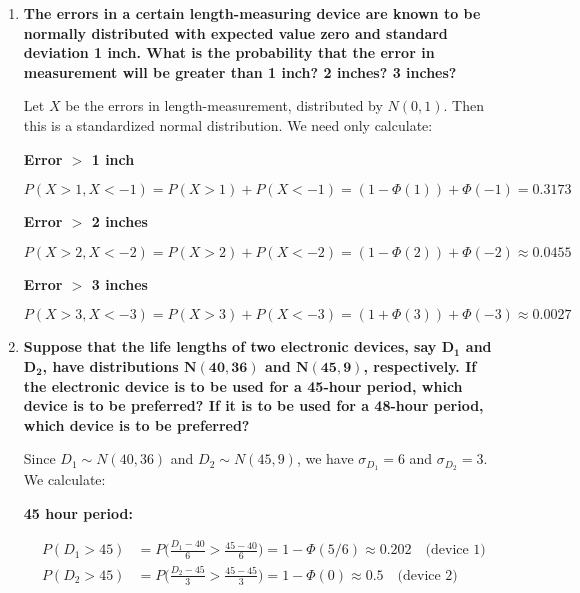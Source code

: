 \documentclass[10pt, oneside]{article}
\begin{document}
\begin{enumerate}[label=9.\arabic*]
We calculate $P(D > 0.825, D < 0.775) = P(\frac{0.825 - 0.8}{0.02} < \frac{D - 0.8}{0.02}) + P(\frac{D - 0.8}{0.02} < \frac{0.775 - 0.8}{0.02}) = (1 - \Phi(1.25)) + \Phi(-1.25) \approx \boxed{0.211}$.

\item  \begin{tcolorbox}[
  colback=Cerulean!5!white,
  colframe=Cerulean!75!black]
\textbf{The errors in a certain length-measuring device are known to be normally distributed with expected value zero and standard deviation 1 inch. What is the probability that the error in measurement will be greater than 1 inch? 2 inches? 3 inches?}
\end{tcolorbox}

Let $X$ be the errors in length-measurement, distributed by $N(0,1)$. Then this is a standardized normal distribution. We need only calculate:

\textbf{Error $\bm{>}$ 1 inch}

\[ P(X > 1, X < -1) = P(X > 1) + P(X < -1) = (1 - \Phi(1)) + \Phi(-1) = \boxed{0.3173} \]

\textbf{Error $\bm{>}$ 2 inches}

\[ P(X > 2, X < -2) = P(X > 2) + P(X < -2) = (1 - \Phi(2)) + \Phi(-2) \approx \boxed{0.0455} \]

\textbf{Error $\bm{>}$ 3 inches}

\[ P(X > 3, X < -3) = P(X > 3) + P(X < -3) = (1 + \Phi(3)) + \Phi(-3) \approx \boxed{0.0027} \]

\item  \begin{tcolorbox}[
  colback=Cerulean!5!white,
  colframe=Cerulean!75!black]
\textbf{Suppose that the life lengths of two electronic devices, say $\bm{D_1}$ and $\bm{D_2}$, have distributions $\bm{N(40,36)}$ and $\bm{N(45,9)}$, respectively. If the electronic device is to be used for a 45-hour period, which device is to be preferred? If it is to be used for a 48-hour period, which device is to be preferred?}
\end{tcolorbox}

Since $D_1 \sim N(40,36)$ and $D_2 \sim N(45,9)$, we have $\sigma_{D_1} = 6$ and $\sigma_{D_2} = 3$. We calculate:

\textbf{45 hour period:}

\begin{align*}
P(D_1 > 45) &= P \bigg( \frac{D_1-40}{6} > \frac{45-40}{6} \bigg) = 1 - \Phi(5/6) \approx \boxed{0.202 \quad \text{(device 1)}} \\
P(D_2 > 45) &= P \bigg( \frac{D_2 - 45}{3} > \frac{45-45}{3} \bigg) = 1 - \Phi(0) \approx \boxed{0.5 \quad \text{(device 2)}}
\end{align*}


\end{enumerate}
\end{document}
